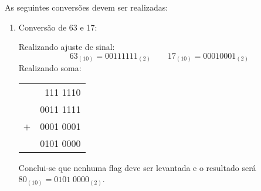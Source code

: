 \documentclass{article}
\begin{document}
            \begin{resolution}
                As seguintes conversões devem ser realizadas:
                \begin{enumerate}
                    \item Conversão de 63 e 17:
                        \begin{figure}[H]
                            \centering
                        \end{figure}
                    Realizando ajuste de sinal:
                        \begin{equation*}
                            \boxed{63_{(10)} = 00111111_{(2)}}
                            \qquad
                            \boxed{17_{(10)} = 00010001_{(2)}}
                        \end{equation*}
                    Realizando soma:
                        \begin{table}[H]
                            \centering  
                            \begin{tabular}[]{cr}
                                  &  111 1110\\
                                  & 0011 1111\\
                                + & 0001 0001\\\hline
                                  & 0101 0000\\
                            \end{tabular}
                        \end{table}
                    Conclui-se que nenhuma flag deve ser levantada e o resultado será $\boxed{80_{(10)} = 0101\;0000_{(2)}}$.
\newpage


\end{enumerate}
\end{resolution}
\end{document}
